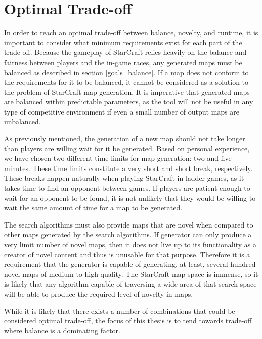 \section{Optimal Trade-off}
\label{goals_tradeoffs}
In order to reach an optimal trade-off between balance, novelty, and runtime, it is important to consider what minimum requirements exist for each part of the trade-off. Because the gameplay of StarCraft relies heavily on the balance and fairness between players and the in-game races, any generated maps must be balanced as described in section \ref{goals_balance}. If a map does not conform to the requirements for it to be balanced, it cannot be considered as a solution to the problem of StarCraft map generation. It is imperative that generated maps are balanced within predictable parameters, as the tool will not be useful in any type of competitive environment if even a small number of output maps are unbalanced.

As previously mentioned, the generation of a new map should not take longer than players are willing wait for it be generated. Based on personal experience, we have chosen two different time limits for map generation: two and five minutes. These time limits constitute a very short and short break, respectively. These breaks happen naturally when playing StarCraft in ladder games, as it takes time to find an opponent between games. If players are patient enough to wait for an opponent to be found, it is not unlikely that they would be willing to wait the same amount of time for a map to be generated.

The search algorithms must also provide maps that are novel when compared to other maps generated by the search algorithms. If generator can only produce a very limit number of novel maps, then it does not live up to its functionality as a creator of novel content and thus is unusable for that purpose. Therefore it is a requirement that the generator is capable of generating, at least, several hundred novel maps of medium to high quality. The StarCraft map space is immense, so it is likely that any algorithm capable of traversing a wide area of that search space will be able to produce the required level of novelty in maps.

While it is likely that there exists a number of combinations that could be considered optimal trade-off, the focus of this thesis is to tend towards trade-off where balance is a dominating factor.
